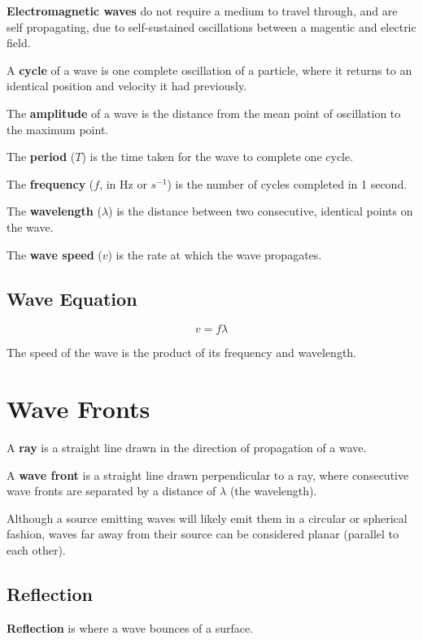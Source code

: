 \documentclass[a4paper,11pt]{report}
\begin{document}
\textbf{Electromagnetic waves} do not require a medium to travel through, and
are self propagating, due to self-sustained oscillations between a magentic and
electric field.

A \textbf{cycle} of a wave is one complete oscillation of a particle, where it
returns to an identical position and velocity it had previously.

The \textbf{amplitude} of a wave is the distance from the mean point of
oscillation to the maximum point.

The \textbf{period} ($T$) is the time taken for the wave to complete one cycle.

The \textbf{frequency} ($f$, in Hz or $s^{-1}$) is the number of cycles
completed in 1 second.

The \textbf{wavelength} ($\lambda$) is the distance between two consecutive,
identical points on the wave.

The \textbf{wave speed} ($v$) is the rate at which the wave propagates.

\subsection{Wave Equation}

$$
v = f \lambda
$$

The speed of the wave is the product of its frequency and wavelength.


\section{Wave Fronts}

A \textbf{ray} is a straight line drawn in the direction of propagation of a
wave.

A \textbf{wave front} is a straight line drawn perpendicular to a ray, where
consecutive wave fronts are separated by a distance of $\lambda$ (the
wavelength).

Although a source emitting waves will likely emit them in a circular or
spherical fashion, waves far away from their source can be considered planar
(parallel to each other).

\subsection{Reflection}


\textbf{Reflection} is where a wave bounces of a surface.
\end{document}
